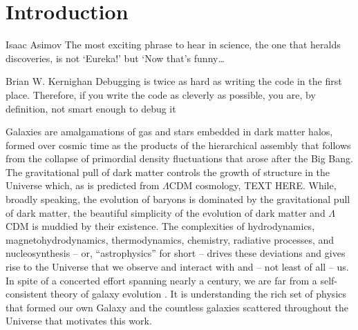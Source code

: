 \chapter[Introduction]{Introduction}
\label{ch:intro}
\vspace{-16pt} 
\begin{chapquote}{Isaac Asimov} \singlespacing The most exciting phrase to hear in science, the one that heralds discoveries, is not ‘Eureka!’ but ‘Now that’s funny…
\end{chapquote} \vspace{-8pt}
\begin{chapquote}{Brian W. Kernighan} \singlespacing Debugging is twice as hard as writing the code in the first place. Therefore, if you write the code as cleverly as possible, you are, by definition, not smart enough to debug it
\end{chapquote} \vspace{-8pt}

\noindent\makebox[\linewidth]{\rule{0.5\textwidth}{0.5pt}} \vspace{1pt}


%

Galaxies are amalgamations of gas and stars embedded in dark matter halos, formed over cosmic time as the products of the hierarchical assembly that follows from the collapse of primordial density fluctuations that arose after the Big Bang. The gravitational pull of dark matter controls the growth of structure in the Universe which, as is predicted from $\Lambda$CDM cosmology, TEXT HERE. While, broadly speaking, the evolution of baryons is dominated by the gravitational pull of dark matter, the beautiful simplicity of the evolution of dark matter and $\Lambda$CDM is muddied by their existence. The complexities of hydrodynamics, magnetohydrodynamics, thermodynamics, chemistry, radiative processes, and nucleosynthesis -- or, ``astrophysics'' for short -- drives these deviations and gives rise to the Universe that we observe and interact with and -- not least of all -- us. In spite of a concerted effort spanning nearly a century, we are far from a self-consistent theory of galaxy evolution \citep[see ][ for a recent review of outstanding problems in galactic evolution]{NaabOstriker2017}. It is understanding the rich set of physics that formed our own Galaxy and the countless galaxies scattered throughout the Universe that motivates this work. 

